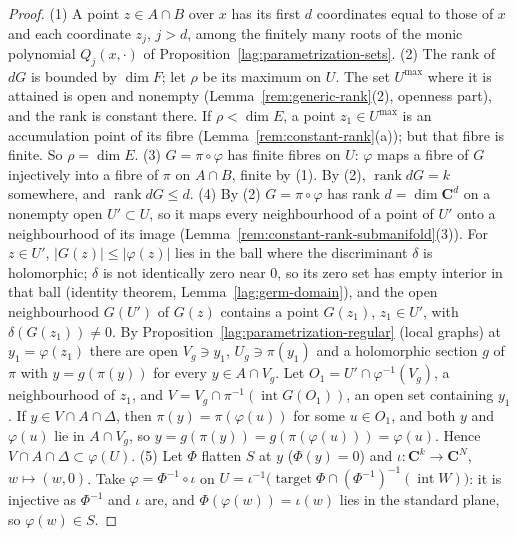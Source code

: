 \begin{proof}
\leanok
(1) A point \(z\in A\cap B\) over \(x\) has its first \(d\) coordinates equal to those of \(x\) and each coordinate \(z_j\), \(j>d\), among the finitely many roots of the monic
polynomial \(Q_j(x,\cdot)\) of Proposition~\ref{lag:parametrization-sets}.
(2) The rank of \(dG\) is bounded by \(\dim F\); let \(\rho\) be its maximum on \(U\). The set \(U^{\max}\) where it is attained is open and nonempty
(Lemma~\ref{rem:generic-rank}(2), openness part), and the rank is constant there. If \(\rho<\dim E\), a point \(z_1\in U^{\max}\) is an accumulation point of its fibre
(Lemma~\ref{rem:constant-rank}(a)); but that fibre is finite. So \(\rho=\dim E\).
(3) \(G=\pi\circ\varphi\) has finite fibres on \(U\): \(\varphi\) maps a fibre of \(G\) injectively into a fibre of \(\pi\) on \(A\cap B\), finite by (1). By (2),
\(\operatorname{rank}dG=k\) somewhere, and \(\operatorname{rank}dG\le d\).
(4) By (2) \(G=\pi\circ\varphi\) has rank \(d=\dim\mathbf C^d\) on a nonempty open \(U'\subset U\), so it maps every neighbourhood of a point of \(U'\) onto a neighbourhood of
its image (Lemma~\ref{rem:constant-rank-submanifold}(3)). For \(z\in U'\), \(|G(z)|\le|\varphi(z)|\) lies in the ball where the discriminant \(\delta\) is holomorphic; \(\delta\) is not
identically zero near \(0\), so its zero set has empty interior in that ball (identity theorem, Lemma~\ref{lag:germ-domain}), and the open neighbourhood \(G(U')\) of \(G(z)\)
contains a point \(G(z_1)\), \(z_1\in U'\), with \(\delta(G(z_1))\ne0\). By Proposition~\ref{lag:parametrization-regular} (local graphs) at \(y_1=\varphi(z_1)\) there are open
\(V_g\ni y_1\), \(U_g\ni\pi(y_1)\) and a holomorphic section \(g\) of \(\pi\) with \(y=g(\pi(y))\) for every \(y\in A\cap V_g\). Let \(O_1=U'\cap\varphi^{-1}(V_g)\), a neighbourhood of
\(z_1\), and \(V=V_g\cap\pi^{-1}(\operatorname{int}G(O_1))\), an open set containing \(y_1\). If \(y\in V\cap A\cap\Delta\), then \(\pi(y)=\pi(\varphi(u))\) for some \(u\in O_1\), and both
\(y\) and \(\varphi(u)\) lie in \(A\cap V_g\), so \(y=g(\pi(y))=g(\pi(\varphi(u)))=\varphi(u)\). Hence \(V\cap A\cap\Delta\subset\varphi(U)\).
(5) Let \(\Phi\) flatten \(S\) at \(y\) (\(\Phi(y)=0\)) and \(\iota\colon\mathbf C^k\to\mathbf C^N\), \(w\mapsto(w,0)\). Take \(\varphi=\Phi^{-1}\circ\iota\) on
\(U=\iota^{-1}\bigl(\operatorname{target}\Phi\cap(\Phi^{-1})^{-1}(\operatorname{int}W)\bigr)\): it is injective as \(\Phi^{-1}\) and \(\iota\) are, and
\(\Phi(\varphi(w))=\iota(w)\) lies in the standard plane, so \(\varphi(w)\in S\).
\end{proof}

